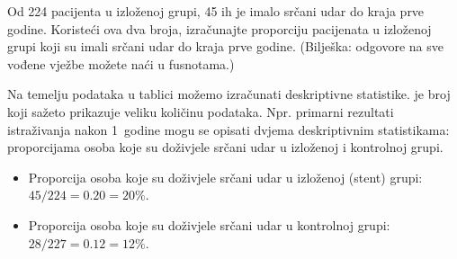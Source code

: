 \begin{exercisewrap}
	\begin{nexercise}
		Od 224 pacijenta u izloženoj grupi, 45 ih je imalo srčani udar do kraja prve godine. Koristeći ova dva broja, izračunajte proporciju pacijenata u izloženoj grupi koji su imali srčani udar do kraja prve godine. (Bilješka: odgovore na sve vođene vježbe možete naći u fusnotama.)\footnotemark
	\end{nexercise}
\end{exercisewrap}


Na temelju podataka u tablici možemo izračunati deskriptivne statistike.
%
je broj koji sažeto prikazuje veliku količinu podataka.
Npr. primarni rezultati istraživanja nakon 1~godine mogu se opisati dvjema deskriptivnim statistikama:
proporcijama osoba koje su doživjele srčani udar u izloženoj i kontrolnoj grupi.


\begin{itemize}
	\setlength{\itemsep}{0mm}
	\item[] Proporcija osoba koje su doživjele srčani udar u izloženoj (stent) grupi: $45/224 = 0.20 = 20\%$.
	\item[] Proporcija osoba koje su doživjele srčani udar u kontrolnoj grupi: $28/227 = 0.12 = 12\%$.
\end{itemize}

